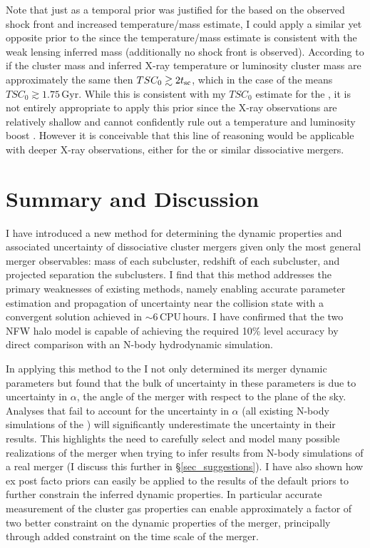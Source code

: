 Note that just as a temporal prior was justified for the  based on the observed shock front and increased temperature/mass estimate, I could apply a similar yet opposite prior to the  since the temperature/mass estimate is consistent with the weak lensing inferred mass (additionally no shock front is observed).  
According to \citet{Randall:2002kk} if the cluster mass and inferred X-ray temperature or luminosity cluster mass are approximately the same then $TSC_0 \gtrsim 2 t_{\rm sc}$, which in the case of the  means $TSC_0 \gtrsim 1.75$\,Gyr.
While this is consistent with my $TSC_0$ estimate for the , it is not entirely appropriate to apply this prior since the X-ray observations are relatively shallow and cannot confidently rule out a temperature and luminosity boost \citep{Dawson:2012dl}.
However it is conceivable that this line of reasoning would be applicable with deeper X-ray observations, either for the  or similar dissociative mergers.

 
\section{Summary and Discussion}\label{summary}

I have introduced a new method for determining the dynamic properties and associated uncertainty of dissociative cluster mergers given only the most general merger observables: mass of each subcluster, redshift of each subcluster, and projected separation the subclusters.
I find that this method addresses the primary weaknesses of existing methods, namely enabling accurate parameter estimation and propagation of uncertainty near the collision state with a convergent solution achieved in $\sim$6\,CPU\,hours. 
I have confirmed that the two NFW halo model is capable of achieving the required 10\% level accuracy by direct comparison with an N-body hydrodynamic simulation.

In applying this method to the  I not only determined its merger dynamic parameters but found that the bulk of uncertainty in these parameters is due to uncertainty in $\alpha$, the angle of the merger with respect to the plane of the sky.
Analyses that fail to account for the uncertainty in $\alpha$ (all existing N-body simulations of the ) will significantly underestimate the uncertainty in their results.
This highlights the need to carefully select and model many possible realizations of the merger when trying to infer results from N-body simulations of a real merger (I discuss this further in \S\ref{sec_suggestions}).
I have also shown how ex post facto priors can easily be applied to the results of the default priors to further constrain the inferred dynamic properties.
In particular accurate measurement of the cluster gas properties can enable approximately a factor of two better constraint on the dynamic properties of the merger, principally through added constraint on the time scale of the merger.

